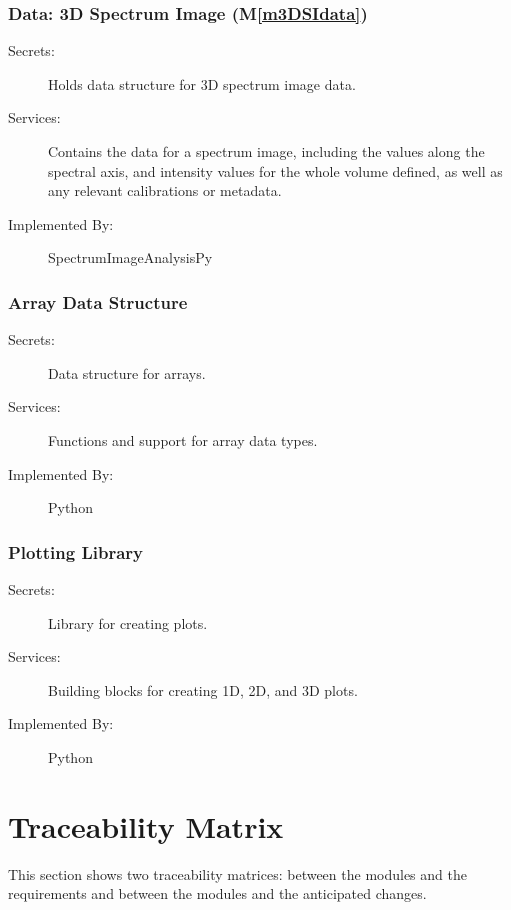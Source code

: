 \documentclass[12pt, titlepage]{article}
\newcommand{\mref}[1]{M\ref{#1}}
\newcommand{\progname}{SpectrumImageAnalysisPy}
\begin{document}
\subsubsection{Data: 3D Spectrum Image (\mref{m3DSIdata})}
\begin{description}
	\item[Secrets:]Holds data structure for 3D spectrum image data.
	\item[Services:]Contains the data for a spectrum image, including the values along the spectral axis, and intensity values for the whole volume defined, as well as any relevant calibrations or metadata.
	\item[Implemented By:] \progname
\end{description}

\subsubsection{Array Data Structure}
\begin{description}
	\item[Secrets:]Data structure for arrays.
	\item[Services:]Functions and support for array data types.
	\item[Implemented By:] Python
\end{description}

\subsubsection{Plotting Library}
\begin{description}
	\item[Secrets:]Library for creating plots.
	\item[Services:]Building blocks for creating 1D, 2D, and 3D plots.
	\item[Implemented By:] Python
\end{description}

\section{Traceability Matrix} \label{SecTM}

This section shows two traceability matrices: between the modules and the
requirements and between the modules and the anticipated changes.
\end{document}
